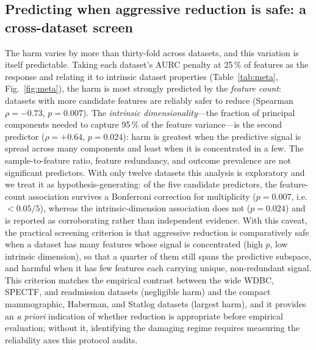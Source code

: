 \documentclass[fleqn,10pt]{wlscirep}
\newcommand{\result}[1]{#1}
\begin{document}
\subsection{Predicting when aggressive reduction is safe: a cross-dataset screen}
\label{sec:metasafe}
The harm varies by more than thirty-fold across datasets, and this variation is itself predictable.
Taking each dataset's AURC penalty at 25\,\% of features as the response and relating it to intrinsic
dataset properties
(Table~\ref{tab:meta}, Fig.~\ref{fig:meta}), the harm is most strongly predicted by the
\emph{feature count}: datasets with more candidate features are reliably safer to reduce (Spearman
$\rho=\result{-0.73}$, $p=\result{0.007}$). The \emph{intrinsic dimensionality}---the fraction of
principal components needed to capture 95\,\% of the feature variance---is the second predictor
($\rho=\result{+0.64}$, $p=\result{0.024}$): harm is greatest when the predictive signal is spread
across many components and least when it is concentrated in a few. The sample-to-feature ratio,
feature redundancy, and outcome prevalence are not significant predictors. With only twelve datasets
this analysis is exploratory and we treat it as hypothesis-generating: of the five candidate
predictors, the feature-count association survives a Bonferroni correction for multiplicity
($p=\result{0.007}$, i.e.\ $<0.05/5$), whereas the intrinsic-dimension association does not
($p=\result{0.024}$) and is reported as corroborating rather than independent evidence. With this
caveat, the practical screening criterion is that aggressive reduction is comparatively safe when a
dataset has many features whose signal is concentrated (high $p$, low intrinsic dimension), so that a
quarter of them still spans the predictive subspace, and harmful when it has few features each carrying
unique, non-redundant signal. This criterion matches the empirical contrast between the wide WDBC,
SPECTF, and readmission datasets (negligible harm) and the compact mammographic, Haberman, and Statlog
datasets (largest harm), and it provides an \emph{a priori} indication of whether reduction is
appropriate before empirical evaluation; without it, identifying the damaging regime requires measuring
the reliability axes this protocol audits.

\begin{table}[t]
\centering
\caption{Dataset properties and the reliability harm (AURC penalty at 25\,\% of features), sorted by
harm. The harm is predicted by the feature count ($p$) and the intrinsic-dim fraction (see text).
Computed from the released per-configuration result summary and the dataset definitions.}
\label{tab:meta}

\end{table}
\end{document}

